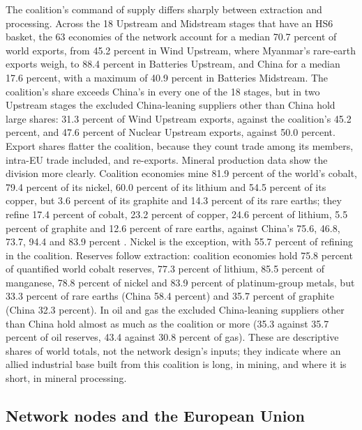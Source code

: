 The coalition's command of supply differs sharply between extraction and processing. Across the
18 Upstream and Midstream stages that have an HS6 basket, the 63 economies of the network account
for a median 70.7 percent of world exports, from 45.2 percent in Wind Upstream, where Myanmar's
rare-earth exports weigh, to 88.4 percent in Batteries Upstream, and China for a median 17.6
percent, with a maximum of 40.9 percent in Batteries Midstream. The coalition's share exceeds
China's in every one of the 18 stages, but in two Upstream stages the excluded China-leaning
suppliers other than China hold large shares: 31.3 percent of Wind Upstream exports, against the
coalition's 45.2 percent, and 47.6 percent of Nuclear Upstream exports, against 50.0 percent. Export shares
flatter the coalition, because they count trade among its members, intra-EU trade included, and
re-exports. Mineral production data show the division more clearly. Coalition economies mine 81.9 percent of the world's cobalt, 79.4 percent
of its nickel, 60.0 percent of its lithium and 54.5 percent of its copper, but 3.6 percent of its
graphite and 14.3 percent of its rare earths; they refine 17.4 percent of cobalt, 23.2 percent of
copper, 24.6 percent of lithium, 5.5 percent of graphite and 12.6 percent of rare earths, against
China's 75.6, 46.8, 73.7, 94.4 and 83.9 percent \citep{iea2026cmdata}. Nickel is the exception,
with 55.7 percent of refining in the coalition. Reserves follow extraction: coalition economies
hold 75.8 percent of quantified world cobalt reserves, 77.3 percent of lithium, 85.5 percent of
manganese, 78.8 percent of nickel and 83.9 percent of platinum-group metals, but 33.3 percent of
rare earths (China 58.4 percent) and 35.7 percent of graphite (China 32.3 percent). In oil and gas
the excluded China-leaning suppliers other than China hold almost as much as the coalition or more
(35.3 against 35.7 percent of oil reserves, 43.4 against 30.8 percent of gas). These are
descriptive shares of world totals, not the network design's inputs; they indicate where an
allied industrial base built from this coalition is long, in mining, and where it is short, in
mineral processing.

\subsection{Network nodes and the European Union}\label{subsec:coalition_nodes}


